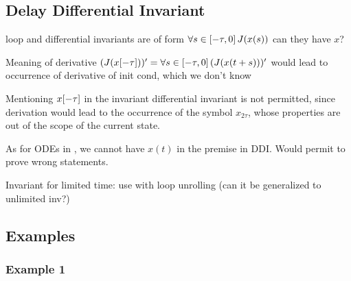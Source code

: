 \documentclass[10pt]{report}
\begin{document}
    \subsection{Delay Differential Invariant}
        \label{sec:delay-differential-invariant}

        loop and differential invariants are of form $\forall s\in[-\tau,0]{\,} J(x(s))$
        can they have $x$?

        Meaning of derivative $(J(x[-\tau]))'=\forall s\in[-\tau,0]{\,} (J(x(t+s)))'$ would lead to occurrence of derivative of init cond, which we don't know

        Mentioning $x[-\tau]$ in the invariant differential invariant is not permitted, since derivation would lead to the occurrence of the symbol $x_{2\tau}$, whose properties are out of the scope of the current state.

        As for ODEs in \dL, we cannot have $x(t)$ in the premise in DDI. Would permit to prove wrong statements.

        Invariant for limited time: use with loop unrolling (can it be generalized to unlimited inv?)

    \subsection{Examples}
        \label{sec:examples}

        \subsubsection{Example 1}
            \label{sec:ddi-example-1}
\end{document}
